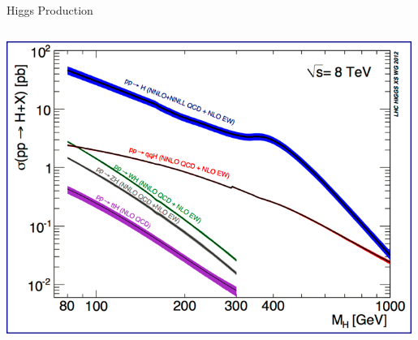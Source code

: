 \begin{frame}{Higgs Production}
\begin{center}
\begin{columns}
\begin{column}{0.65\textwidth}
    \includegraphics[width=0.99\textwidth]{images/higgs_production_lhc.png}
  \end{column}
\end{columns}
\end{center}
\end{frame}








